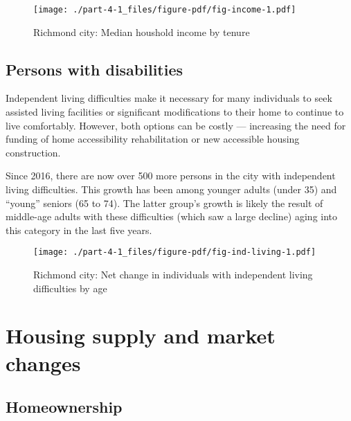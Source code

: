 \documentclass[
  letterpaper,
  DIV=11,
  numbers=noendperiod]{scrreprt}
\begin{document}
\begin{figure}

{\centering \texttt{[image: ./part-4-1\_files/figure-pdf/fig-income-1.pdf]}

}

\caption{\label{fig-income}Richmond city: Median houshold income by
tenure}

\end{figure}

\hypertarget{persons-with-disabilities}{%
\subsection{Persons with disabilities}\label{persons-with-disabilities}}

Independent living difficulties make it necessary for many individuals
to seek assisted living facilities or significant modifications to their
home to continue to live comfortably. However, both options can be
costly --- increasing the need for funding of home accessibility
rehabilitation or new accessible housing construction.

Since 2016, there are now over 500 more persons in the city with
independent living difficulties. This growth has been among younger
adults (under 35) and ``young'' seniors (65 to 74). The latter group's
growth is likely the result of middle-age adults with these difficulties
(which saw a large decline) aging into this category in the last five
years.

\begin{figure}

{\centering \texttt{[image: ./part-4-1\_files/figure-pdf/fig-ind-living-1.pdf]}

}

\caption{\label{fig-ind-living}Richmond city: Net change in individuals
with independent living difficulties by age}

\end{figure}

\hypertarget{housing-supply-and-market-changes}{%
\section{Housing supply and market
changes}\label{housing-supply-and-market-changes}}

\hypertarget{homeownership}{%
\subsection{Homeownership}\label{homeownership}}
\end{document}
